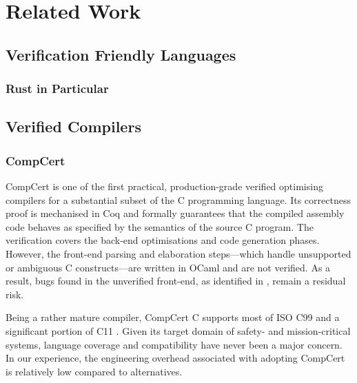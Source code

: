 \chapter{Related Work}
\label{ch:related-work}

\section{Verification Friendly Languages}
\subsection{Rust in Particular}

\newpage

\section{Verified Compilers}
\subsection{CompCert}

CompCert is one of the first practical, production-grade verified optimising compilers for a substantial subset of the C programming language. Its correctness proof is mechanised in Coq and formally guarantees that the compiled assembly code behaves as specified by the semantics of the source C program. The verification covers the back-end optimisations and code generation phases. However, the front-end parsing and elaboration steps—which handle unsupported or ambiguous C constructs—are written in OCaml and are not verified. As a result, bugs found in the unverified front-end, as identified in \citep{yang2011compilerbugs}, remain a residual risk.

Being a rather mature compiler, CompCert C supports most of ISO C99 and a significant portion of C11 \citep{leroy2009compcert}. Given its target domain of safety- and mission-critical systems, language coverage and compatibility have never been a major concern. In our experience, the engineering overhead associated with adopting CompCert is relatively low compared to alternatives.

